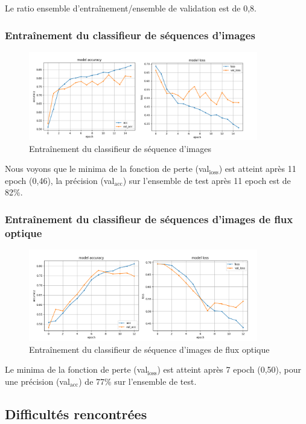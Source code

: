 \documentclass[11pt]{article}
\begin{document}
Le ratio ensemble d'entraînement/ensemble de validation est de 0,8.\\

\subsubsection{Entraînement du classifieur de séquences d'images}
\label{sec:orgdcc5b69}
\begin{figure}[htbp]
\centering
\includegraphics[width=10cm]{conv_train.png}
\caption{Entraînement du classifieur de séquence d'images}
\end{figure}
Nous voyons que le minima de la fonction de perte (val\(_{\text{loss}}\)) est atteint après 11 epoch (0,46), la précision (val\(_{\text{acc}}\)) sur l'ensemble de test après 11 epoch est de 82\%.\\
\subsubsection{Entraînement du classifieur de séquences d'images de flux optique}
\label{sec:org7301e1b}
\begin{figure}[htbp]
\centering
\includegraphics[width=10cm]{flow_train.png}
\caption{Entraînement du classifieur de séquence d'images de flux optique}
\end{figure}
Le minima de la fonction de perte (val\(_{\text{loss}}\)) est atteint après 7 epoch (0,50), pour une précision (val\(_{\text{acc}}\)) de 77\% sur l'ensemble de test.\\

\subsection{Difficultés rencontrées}
\label{sec:org1a261a8}
\end{document}
